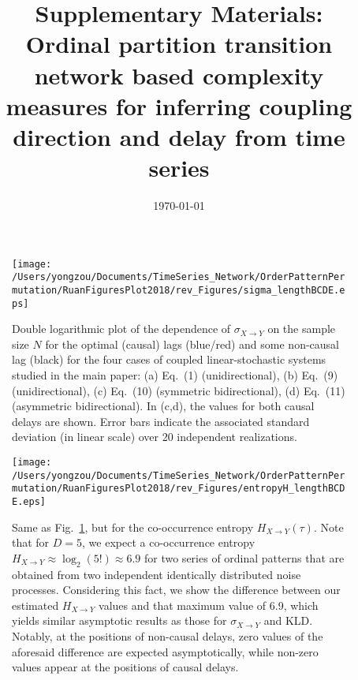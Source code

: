 \documentclass[aps,pre,superscriptaddress,floats,11pt]{revtex4}
\begin{document}
\title{Supplementary Materials: \\ Ordinal partition transition network based complexity measures for inferring coupling direction and delay from time series}

\date{\today}

\maketitle

\renewcommand{\thepage}{SM-\arabic{page}}  
\renewcommand{\thesection}{SM-\Roman{section}}   
\renewcommand{\theequation}{S\arabic{equation}}  
\renewcommand{\thetable}{S\arabic{table}}   
\renewcommand{\thefigure}{S\arabic{figure}}

\begin{figure}[htb]
	\centering
	\texttt{[image: /Users/yongzou/Documents/TimeSeries\_Network/OrderPatternPermutation/RuanFiguresPlot2018/rev\_Figures/sigma\_lengthBCDE.eps]}
\caption{Double logarithmic plot of the dependence of $\sigma_{X\to Y}$ on the sample size $N$ for the optimal (causal) lags (blue/red) and some non-causal lag (black) for the four cases of coupled linear-stochastic systems studied in the main paper: (a) Eq.~(1) (unidirectional), (b) Eq.~(9) (unidirectional), (c) Eq.~(10) (symmetric bidirectional), (d) Eq.~(11) (asymmetric bidirectional). In (c,d), the values for both causal delays are shown. Error bars indicate the associated standard deviation (in linear scale) over 20 independent realizations.  \label{fig:sampleSizeBCDEsigma}}
\end{figure}

\begin{figure}[htb]
	\centering
	\texttt{[image: /Users/yongzou/Documents/TimeSeries\_Network/OrderPatternPermutation/RuanFiguresPlot2018/rev\_Figures/entropyH\_lengthBCDE.eps]}
\caption{Same as Fig.~\ref{fig:sampleSizeBCDEsigma}, but for the co-occurrence entropy $H_{X\to Y}(\tau)$. Note that for $D=5$, we expect a co-occurrence entropy $H_{X \to Y} \approx \log_2 (5!) \approx 6.9$ for two series of ordinal patterns that are obtained from two independent identically distributed noise processes. Considering this fact, we show the difference between our estimated $H_{X \to Y}$ values and that maximum value of 6.9, which yields similar asymptotic results as those for $\sigma_{X\to Y}$ and KLD. Notably, at the positions of non-causal delays, zero values of the aforesaid difference are expected asymptotically, while non-zero values appear at the positions of causal delays. \label{fig:sampleSizeBCDEentropy}}
\end{figure}
\end{document}
